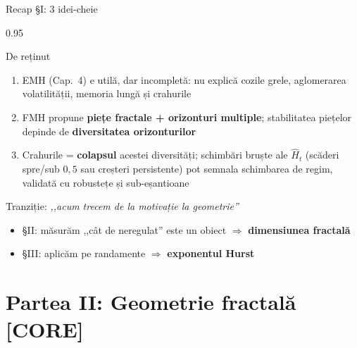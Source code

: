 \documentclass[9pt, aspectratio=169, t]{beamer}
\begin{document}
\begin{frame}[shrink=15]{Recap §I: 3 idei-cheie}
\begin{cminipage}{0.95\textwidth}
\begin{block}{De reținut}
\begin{enumerate}\setlength{\itemsep}{4pt}
    \item EMH (Cap.~4) e utilă, dar incompletă: nu explică cozile grele, aglomerarea volatilității, memoria lungă și crahurile
    \item FMH propune \textbf{piețe fractale + orizonturi multiple}; stabilitatea piețelor depinde de \textbf{diversitatea orizonturilor}
    \item Crahurile = \textbf{colapsul} acestei diversități; schimbări bruște ale $\hat{H}_t$ (scăderi spre/sub $0{,}5$ sau creșteri persistente) pot semnala schimbarea de regim, validată cu robustețe și sub-eșantioane
\end{enumerate}
\end{block}
\begin{exampleblock}{Tranziție: \textit{,,acum trecem de la motivație la geometrie''}}
\begin{itemize}\setlength{\itemsep}{0pt}
    \item §II: măsurăm ,,cât de neregulat'' este un obiect $\Rightarrow$ \textbf{dimensiunea fractală}
    \item §III: aplicăm pe randamente $\Rightarrow$ \textbf{exponentul Hurst}
\end{itemize}
\end{exampleblock}
\end{cminipage}
\end{frame}

\section{Partea II: Geometrie fractală [CORE]}
\end{document}
